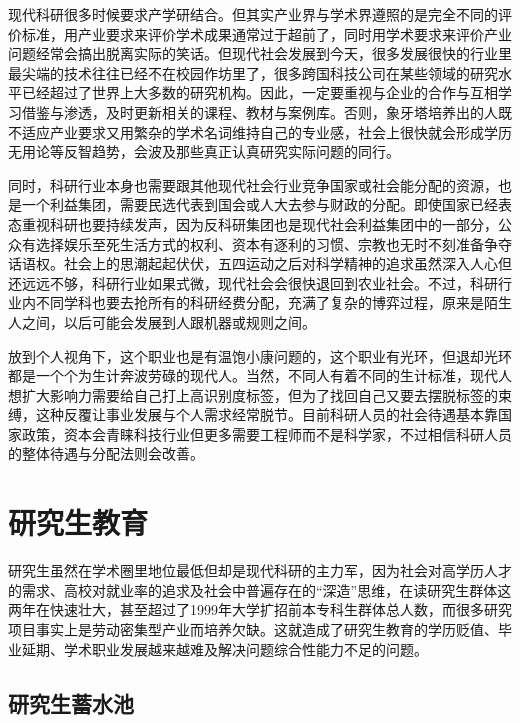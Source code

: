 \documentclass[]{tufte-book}
\begin{document}
现代科研很多时候要求产学研结合。但其实产业界与学术界遵照的是完全不同的评价标准，用产业要求来评价学术成果通常过于超前了，同时用学术要求来评价产业问题经常会搞出脱离实际的笑话。但现代社会发展到今天，很多发展很快的行业里最尖端的技术往往已经不在校园作坊里了，很多跨国科技公司在某些领域的研究水平已经超过了世界上大多数的研究机构。因此，一定要重视与企业的合作与互相学习借鉴与渗透，及时更新相关的课程、教材与案例库。否则，象牙塔培养出的人既不适应产业要求又用繁杂的学术名词维持自己的专业感，社会上很快就会形成学历无用论等反智趋势，会波及那些真正认真研究实际问题的同行。

同时，科研行业本身也需要跟其他现代社会行业竞争国家或社会能分配的资源，也是一个利益集团，需要民选代表到国会或人大去参与财政的分配。即使国家已经表态重视科研也要持续发声，因为反科研集团也是现代社会利益集团中的一部分，公众有选择娱乐至死生活方式的权利、资本有逐利的习惯、宗教也无时不刻准备争夺话语权。社会上的思潮起起伏伏，五四运动之后对科学精神的追求虽然深入人心但还远远不够，科研行业如果式微，现代社会会很快退回到农业社会。不过，科研行业内不同学科也要去抢所有的科研经费分配，充满了复杂的博弈过程，原来是陌生人之间，以后可能会发展到人跟机器或规则之间。

放到个人视角下，这个职业也是有温饱小康问题的，这个职业有光环，但退却光环都是一个个为生计奔波劳碌的现代人。当然，不同人有着不同的生计标准，现代人想扩大影响力需要给自己打上高识别度标签，但为了找回自己又要去摆脱标签的束缚，这种反覆让事业发展与个人需求经常脱节。目前科研人员的社会待遇基本靠国家政策，资本会青睐科技行业但更多需要工程师而不是科学家，不过相信科研人员的整体待遇与分配法则会改善。

\hypertarget{ux7814ux7a76ux751fux6559ux80b2}{%
\section{研究生教育}\label{ux7814ux7a76ux751fux6559ux80b2}}

研究生虽然在学术圈里地位最低但却是现代科研的主力军，因为社会对高学历人才的需求、高校对就业率的追求及社会中普遍存在的``深造''思维，在读研究生群体这两年在快速壮大，甚至超过了1999年大学扩招前本专科生群体总人数，而很多研究项目事实上是劳动密集型产业而培养欠缺。这就造成了研究生教育的学历贬值、毕业延期、学术职业发展越来越难及解决问题综合性能力不足的问题。

\hypertarget{ux7814ux7a76ux751fux84c4ux6c34ux6c60}{%
\subsection{研究生蓄水池}\label{ux7814ux7a76ux751fux84c4ux6c34ux6c60}}
\end{document}
